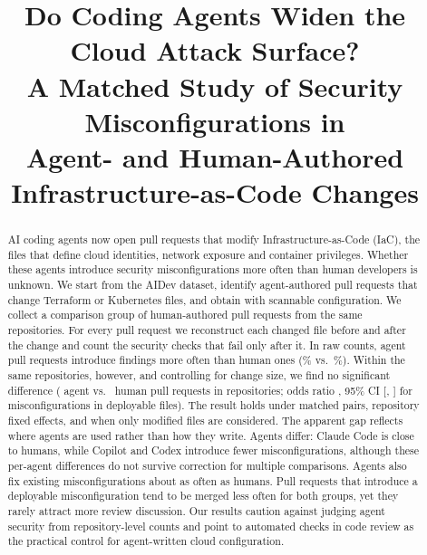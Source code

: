 \documentclass[10pt,conference]{IEEEtran}
\begin{document}
\title{Do Coding Agents Widen the Cloud Attack Surface?\\
A Matched Study of Security Misconfigurations in\\ Agent- and Human-Authored Infrastructure-as-Code Changes}

\author{
}

\maketitle

\begin{abstract}
AI coding agents now open pull requests that modify Infrastructure-as-Code (IaC), the files that define cloud identities, network exposure and container privileges. Whether these agents introduce security misconfigurations more often than human developers is unknown. We start from the AIDev dataset, identify \NaidevIac{} agent-authored pull requests that change Terraform or Kubernetes files, and obtain \NagentAll{} with scannable configuration. We collect a comparison group of \NhumanAll{} human-authored pull requests from the same repositories. For every pull request we reconstruct each changed file before and after the change and count the security checks that fail only after it. In raw counts, agent pull requests introduce findings more often than human ones (\RawAgentPct\% vs.\ \RawHumanPct\%). Within the same repositories, however, and controlling for change size, we find no significant difference (\NagentSame{} agent vs.\ \NhumanSame{} human pull requests in \Nrepos{} repositories; odds ratio \ORProd, 95\% CI [\ORloProd, \ORhiProd] for misconfigurations in deployable files). The result holds under matched pairs, repository fixed effects, and when only modified files are considered. The apparent gap reflects where agents are used rather than how they write. Agents differ: Claude Code is close to humans, while Copilot and Codex introduce fewer misconfigurations, although these per-agent differences do not survive correction for multiple comparisons. Agents also fix existing misconfigurations about as often as humans. Pull requests that introduce a deployable misconfiguration tend to be merged less often for both groups, yet they rarely attract more review discussion. Our results caution against judging agent security from repository-level counts and point to automated checks in code review as the practical control for agent-written cloud configuration.
\end{abstract}
\end{document}
